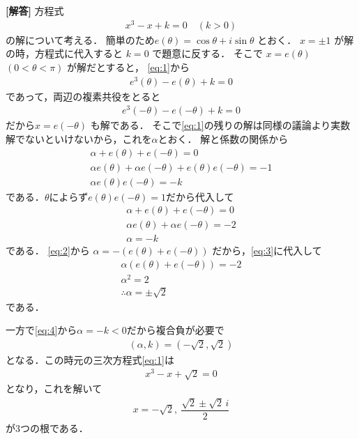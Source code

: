 \documentclass[../../main.tex]{subfiles}
\begin{document}
\begin{oframed}
  
\end{oframed}

{\bf [解答]}
方程式
\begin{align}
  x^3-x+k = 0 \quad (k>0) \label{eq:1}
\end{align}
の解について考える．
簡単のため$e(\theta) = \cos\theta+i\sin\theta$ とおく．
$x=\pm 1$ が解の時，方程式に代入すると $k=0$ で題意に反する．
そこで $x=e(\theta)$ $(0<\theta<\pi)$ が解だとすると，
\cref{eq:1}から
\begin{align}
  e^3(\theta) - e(\theta) + k = 0
\end{align}
であって，両辺の複素共役をとると
\begin{align}
  e^3(-\theta) - e(-\theta) + k = 0
\end{align}
だから$x=e(-\theta)$ も解である．
そこで\cref{eq:1}の残りの解は同様の議論より実数解でないといけないから，これを$\alpha$とおく．
解と係数の関係から
\begin{align}
  \alpha+e(\theta)+e(-\theta)=0 \\
  \alpha e(\theta)+\alpha e(-\theta)+e(\theta)e(-\theta)=-1 \\
  \alpha e(\theta)e(-\theta) = -k
\end{align}
である．$\theta$によらず$e(\theta)e(-\theta)=1$だから代入して
\begin{align}
  \alpha+e(\theta)+e(-\theta)=0  \label{eq:2}\\
  \alpha e(\theta)+\alpha e(-\theta)=-2 \label{eq:3}\\
  \alpha = -k  \label{eq:4}
\end{align}
である．
\cref{eq:2}から $\alpha=-(e(\theta)+e(-\theta))$ だから，\cref{eq:3}に代入して
\begin{align}
  \alpha\left(e(\theta)+e(-\theta)\right) = -2 \\
  \alpha^2 = 2 \\
  \therefore \alpha=\pm\sqrt{2}
\end{align}
である．

一方で\cref{eq:4}から$\alpha=-k<0$だから複合負が必要で
\begin{align}
  (\alpha,k)=(-\sqrt{2},\sqrt{2})
\end{align}
となる．この時元の三次方程式\cref{eq:1}は
\begin{align}
  x^3-x+\sqrt{2} = 0
\end{align}
となり，これを解いて
\begin{align}
  x=-\sqrt{2},\ \dfrac{\sqrt{2}\pm\sqrt{2}\,i}{2}
\end{align}
が3つの根である．

\newpage
\end{document}
